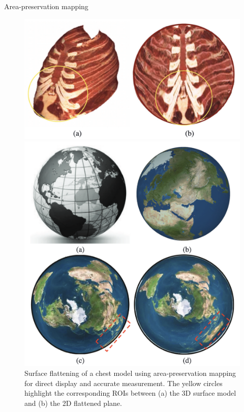 \begin{frame}{Area-preservation mapping}
    \footnotesize
    \vspace{-1.2em}
    \begin{figure}
        \centering
        \captionsetup{font=scriptsize}
        \begin{minipage}[c]{0.45\linewidth}
            \vspace{0pt}
            \centering
            \includegraphics[width=\textwidth]{png/bones.png}
            \caption{Surface flattening of a chest model using 
            area-preservation mapping for direct display and accurate measurement. 
            The yellow circles highlight the corresponding ROIs between 
            (a) the 3D surface model and 
            (b) the 2D flattened plane.}
        \end{minipage}
        \hfill
        \begin{minipage}[c]{0.45\linewidth}
            \vspace{0pt}
            \centering
            \includegraphics[width=\textwidth]{png/earth.png}

\end{minipage}
\end{figure}
\end{frame}
